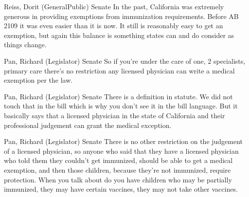 \begin{result}{15.542348794795622}{Reiss, Dorit (GeneralPublic) Senate}
In the past, California was extremely generous in providing exemptions from immunization requirements. Before AB 2109 it was even easier than it is now. It still is reasonably easy to get an exemption, but again this balance is something states can and do consider as things change.
\end{result}

\begin{result}{14.421991099835951}{Pan, Richard (Legislator) Senate}
So if you're under the care of one, 2 specialists, primary care there's no restriction any licensed physician can write a medical exemption per the law.
\end{result}

\begin{result}{13.499722256772912}{Pan, Richard (Legislator) Senate}
There is a definition in statute. We did not touch that in the bill which is why you don't see it in the bill language. But it basically says that a licensed physician in the state of California and their professional judgement can grant the medical exception.
\end{result}

\begin{result}{13.032809048933341}{Pan, Richard (Legislator) Senate}
There is no other restriction on the judgement of a licensed physician, so anyone who said that they have a licensed physician who told them they couldn't get immunized, should be able to get a medical exemption, and then those children, because they're not immunized, require protection. When you talk about do you have children who may be partially immunized, they may have certain vaccines, they may not take other vaccines.
\end{result}

